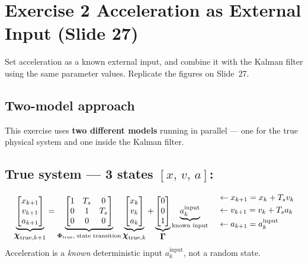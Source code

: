 \documentclass[12pt, a4paper]{article}
\begin{document}
\section*{Exercise 2 \quad Acceleration as External Input (Slide 27)}
Set acceleration as a known external input,
and combine it with the Kalman filter using the same parameter values.
Replicate the figures on Slide~27.
\vspace{-0.2cm}
\subsection*{Two-model approach}
\vspace{-0.2cm}
This exercise uses \textbf{two different models} running in parallel ---
one for the true physical system and one inside the Kalman filter.

\vspace{-0.2cm}
\subsection*{True system --- 3 states $[x,\,v,\,a]$:}
\vspace{-0.2cm}
\[
\underbrace{
\begin{bmatrix} x_{k+1} \\ v_{k+1} \\ a_{k+1} \end{bmatrix}
}_{\displaystyle\boldsymbol{\chi}_{\text{true},k+1}}
=
\underbrace{
\begin{bmatrix} 1 & T_s & 0 \\ 0 & 1 & T_s \\ 0 & 0 & 0 \end{bmatrix}
}_{\boldsymbol{\Phi}_{\text{true}},\;{\scriptsize\text{state transition}}}
\underbrace{
\begin{bmatrix} x_k \\ v_k \\ a_k \end{bmatrix}
}_{\displaystyle\boldsymbol{\chi}_{\text{true},k}}
+
\underbrace{
\begin{bmatrix} 0 \\ 0 \\ 1 \end{bmatrix}
}_{\displaystyle\boldsymbol{\Gamma}}
\underbrace{
a_k^{\text{input}}
}_{\scriptsize\text{known input}}
\quad
\begin{aligned}
  &\leftarrow x_{k+1} = x_k + T_s v_k\\
  &\leftarrow v_{k+1} = v_k + T_s a_k\\
  &\leftarrow a_{k+1} = a_k^{\text{input}}
\end{aligned}
\]
Acceleration is a \emph{known} deterministic input $a_k^{\text{input}}$, not a random state.
\vspace{-0.2cm}
\end{document}

